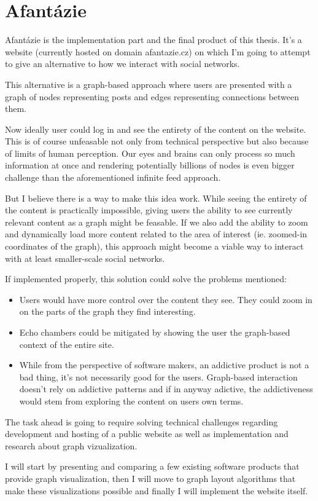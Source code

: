 \section*{Afantázie}
Afantázie is the implementation part and the final product of this thesis.
It's a website (currently hosted on domain afantazie.cz)
on which I'm going to attempt to give an alternative to how we interact with social networks.

This alternative is a graph-based approach where
users are presented with a graph of nodes representing posts and edges representing connections between them.

Now ideally user could log in and see the entirety of the content on the website.
This is of course unfeasable not only from technical perspective but also because of limits of human perception.
Our eyes and brains can only process so much information at once
and rendering potentially billions of nodes is even bigger challenge than the aforementioned infinite feed approach.

But I believe there is a way to make this idea work.
While seeing the entirety of the content is practically impossible,
giving users the ability to see currently relevant content as a graph might be feasable.
If we also add the ability to zoom and dynamically load more content related to the area of interest (ie. zoomed-in coordinates of the graph),
this approach might become a viable way to interact with at least smaller-scale social networks.

If implemented properly, this solution could solve the problems mentioned:
\begin{itemize}
  \item Users would have more control over the content they see. They could zoom in on the parts of the graph they find interesting.
  \item Echo chambers could be mitigated by showing the user the graph-based context of the entire site.
  \item While from the perspective of software makers, an addictive product is not a bad thing, it's not necessarily good for the users.
    Graph-based interaction doesn't rely on addictive patterns and if in anyway adictive,
    the addictiveness would stem from exploring the content on users own terms.
\end{itemize}


The task ahead is going to require solving technical challenges regarding development and hosting of a public website
as well as implementation and research about graph vizualization.

I will start by presenting and comparing a few existing software products that provide graph visualization,
then I will move to graph layout algorithms that make these visualizations possible and finally I will implement the website itself.
